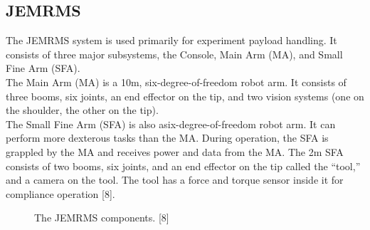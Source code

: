 \documentclass[a4paper,12pt,oneside]{report}
\begin{document}
\subsection{JEMRMS}
The JEMRMS system is used primarily for experiment payload handling. It consists of three major subsystems, the
Console, Main Arm (MA), and Small Fine Arm (SFA).\\
The Main Arm (MA) is a 10m, six-degree-of-freedom robot arm. It consists of three booms, six joints, an end effector on the tip, and two vision systems (one on the shoulder, the other on the tip).\\
The Small Fine Arm (SFA) is also asix-degree-of-freedom robot arm. It can perform more dexterous tasks than the MA. During operation, the SFA is grappled by the MA and receives power and data from the MA. The 2m SFA consists of two booms, six joints, and an end effector on the tip called the “tool,” and a camera on the tool. The tool has a force and torque sensor inside it for compliance operation [8].\\
\begin{figure}[h]
  \centering
   \quad
{} 
  \caption{The JEMRMS components. [8]}
  \label{JEMRMS_components}
\end{figure}
\end{document}
